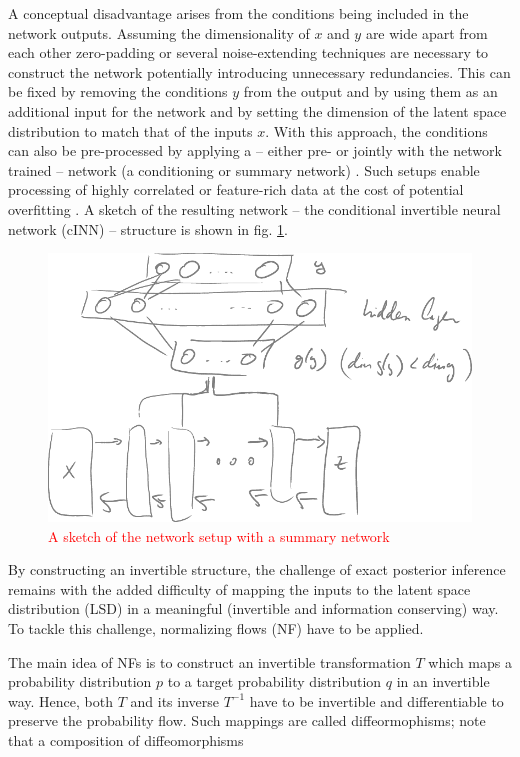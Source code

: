 
A conceptual disadvantage arises from the conditions being included in the network outputs. Assuming the dimensionality of $x$ and $y$ are wide apart from each other zero-padding or several noise-extending techniques are necessary to construct the network potentially introducing unnecessary redundancies. This can be fixed by removing the conditions $y$ from the output and by using them as an additional input for the network and by setting the dimension of the latent space distribution to match that of the inputs $x$. With this approach, the conditions can also be pre-processed by applying a -- either pre- or jointly with the network trained -- network (a conditioning or summary network) \cite{BayesFlow}. Such setups enable processing of highly correlated or feature-rich data at the cost of potential overfitting \cite{Ksoll_2020}. A sketch of the resulting network -- the conditional invertible neural network (cINN) -- structure is shown in fig. \ref{fig:cINN_archicture}.

\begin{figure}[h!]
	\centering
	\includegraphics[width=0.4\linewidth]{figures/neural_networks/SN-cINN.pdf}
	\caption{\textcolor{red}{A sketch of the network setup with a summary network}}
	\label{fig:cINN_archicture}
\end{figure}

By constructing an invertible structure, the challenge of exact posterior inference remains with the added difficulty of mapping the inputs to the latent space distribution (LSD) in a meaningful (invertible and information conserving) way. To tackle this challenge, normalizing flows (NF) have to be applied.


The main idea of NFs is to construct an invertible transformation $T$ which maps a probability distribution $p$ to a target probability distribution $q$ in an invertible way. Hence, both $T$ and its inverse $T^{-1}$ have to be invertible and differentiable to preserve the probability flow. Such mappings are called diffeormophisms; note that a composition of diffeomorphisms

